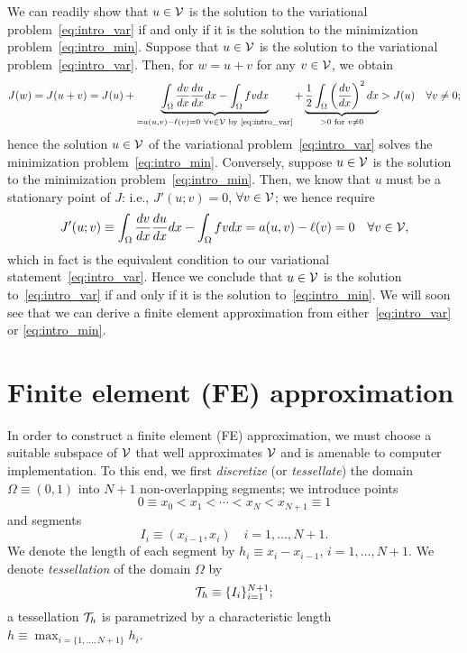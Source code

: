 We can readily show that $u \in \mathcal{V}$ is the solution to the variational problem~\eqref{eq:intro_var} if and only if it is the solution to the minimization problem~\eqref{eq:intro_min}.  Suppose that $u \in \mathcal{V}$ is the solution to the variational problem~\eqref{eq:intro_var}.  Then, for $w = u + v$ for any $v \in \mathcal{V}$, we obtain
\begin{align*}
  J(w) = J(u + v) = J(u) + \underbrace{ \int_{\Omega} \frac{d v}{d x} \frac{d u}{d x} dx - \int_\Omega f v dx}_{= a(u,v) - \ell(v) = 0 \ \forall v \in \mathcal{V} \text{ by \eqref{eq:intro_var}}}
  + \underbrace{ \frac{1}{2} \int_{\Omega} \left( \frac{d v}{d x} \right)^2 dx }_{> 0 \text{ for } v \neq 0} > J(u) \quad \forall v \neq 0;
\end{align*}
hence the solution $u \in \mathcal{V}$ of the variational problem~\eqref{eq:intro_var} solves the minimization problem~\eqref{eq:intro_min}. 
Conversely, suppose $u \in \mathcal{V}$ is the solution to the minimization problem~\eqref{eq:intro_min}.  Then, we know that $u$ must be a stationary point of $J$: i.e., $J'(u;v) = 0$, $\forall v \in \mathcal{V}$; we hence require
\begin{equation*}
  J'(u;v) \equiv
  \int_{\Omega} \frac{d v}{d x} \frac{d u}{d x} dx
  - \int_{\Omega} f v dx
  = a(u,v) - \ell(v) = 0 \quad \forall v \in \mathcal{V},
\end{equation*}
which in fact is the equivalent condition to our variational statement~\eqref{eq:intro_var}. Hence we conclude that $u \in \mathcal{V}$ is the solution to~\eqref{eq:intro_var} if and only if it is the solution to~\eqref{eq:intro_min}.  We will soon see that we can derive a finite element approximation from either~\eqref{eq:intro_var} or \eqref{eq:intro_min}.

\section{Finite element (FE) approximation}
In order to construct a finite element (FE) approximation, we must choose a suitable subspace of $\mathcal{V}$ that well approximates $\mathcal{V}$ and is amenable to computer implementation. To this end, we first \emph{discretize} (or \emph{tessellate}) the domain $\Omega \equiv (0,1)$ into $N+1$ non-overlapping segments; we introduce points
\begin{equation*}
  0 \equiv x_0 < x_1 < \cdots < x_N < x_{N+1} \equiv 1
\end{equation*}
and segments
\begin{equation*}
  I_i \equiv (x_{i-1}, x_i) \quad i = 1,\dots,N+1.
\end{equation*}
We denote the length of each segment by $h_i \equiv x_i - x_{i-1}$, $i = 1,\dots,N+1$.  We denote \emph{tessellation} of the domain $\Omega$ by
\begin{equation}
  \mathcal{T}_h \equiv \{ I_i \}_{i=1}^{N+1};
  \label{eq:intro_Th}
\end{equation}
a tessellation $\mathcal{T}_h$ is parametrized by a characteristic length $h \equiv \max_{i=\{ 1,\dots,N+1\}} h_i$.

